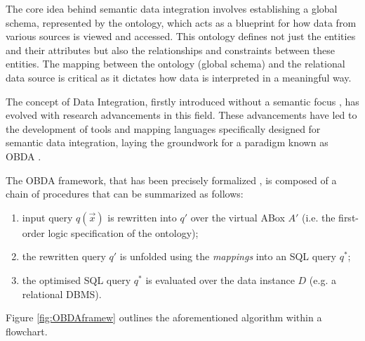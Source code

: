 The core idea behind semantic data integration involves establishing a global schema, represented by the ontology, which acts as a blueprint for how data from various sources is viewed and accessed. This ontology defines not just the entities and their attributes but also the relationships and constraints between these entities. The mapping between the ontology (global schema) and the relational data source is critical as it dictates how data is interpreted in a meaningful way.

The concept of Data Integration, firstly introduced without a semantic focus \cite{DBLP:conf/pods/Lenzerini02}, has evolved with research advancements in this field. These advancements have led to the development of tools and mapping languages specifically designed for semantic data integration, laying the groundwork for a paradigm known as \ac{OBDA} \cite{DBLP:conf/ijcai/XiaoCKLPRZ18}.

The \ac{OBDA} framework, that has been precisely formalized \cite{DBLP:conf/aiia/BotoevaCCCX18}, is composed of a chain of procedures that can be summarized as follows:
\begin{enumerate}
    \item input query ${q(\vec{x})}$ is rewritten \cite{DBLP:conf/otm/MakrisGBC10} into ${q'}$ over the virtual ABox ${A'}$ (i.e. the first-order logic specification of the ontology);
    \item the rewritten query ${q'}$ is unfolded using the \textit{mappings} into an \ac{SQL} query ${q^*}$;
    \item the optimised \ac{SQL} query ${q^*}$ is evaluated over the data instance ${D}$ (e.g. a relational \ac{DBMS}).
\end{enumerate}

Figure \ref{fig:OBDAframew} outlines the aforementioned algorithm within a flowchart.

